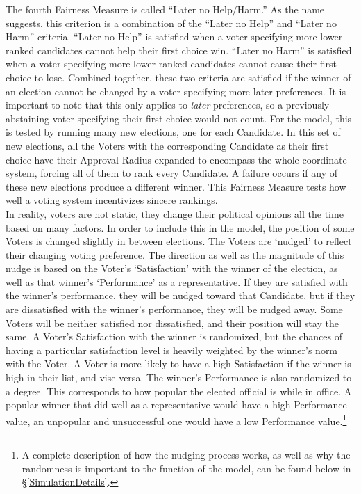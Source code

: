 \documentclass[12pt]{article}
\begin{document}
\qquad The fourth Fairness Measure is called ``Later no Help/Harm.'' As the name suggests, this criterion is a combination of the ``Later no Help'' and ``Later no Harm'' criteria. ``Later no Help'' is satisfied when a voter specifying more lower ranked candidates cannot help their first choice win. ``Later no Harm'' is satisfied when a voter specifying more lower ranked candidates cannot cause their first choice to lose. Combined together, these two criteria are satisfied if the winner of an election cannot be changed by a voter specifying more later preferences. It is important to note that this only applies to \textit{later} preferences, so a previously abstaining voter specifying their first choice would not count. For the model, this is tested by running many new elections, one for each Candidate. In this set of new elections, all the Voters with the corresponding Candidate as their first choice have their Approval Radius expanded to encompass the whole coordinate system, forcing all of them to rank every Candidate. A failure occurs if any of these new elections produce a different winner. This Fairness Measure tests how well a voting system incentivizes sincere rankings. \\ 

\qquad In reality, voters are not static, they change their political opinions all the time based on many factors. In order to include this in the model, the position of some Voters is changed slightly in between elections. The Voters are `nudged' to reflect their changing voting preference. The direction as well as the magnitude of this nudge is based on the Voter's `Satisfaction' with the winner of the election, as well as that winner's `Performance' as a representative. If they are satisfied with the winner's performance, they will be nudged toward that Candidate, but if they are dissatisfied with the winner's performance, they will be nudged away. Some Voters will be neither satisfied nor dissatisfied, and their position will stay the same. A Voter's Satisfaction with the winner is randomized, but the chances of having a particular satisfaction level is heavily weighted by the winner's norm with the Voter. A Voter is more likely to have a high Satisfaction if the winner is high in their list, and vise-versa. The winner's Performance is also randomized to a degree. This corresponds to how popular the elected official is while in office. A popular winner that did well as a representative would have a high Performance value, an unpopular and unsuccessful one would have a low Performance value.\footnote{A complete description of how the nudging process works, as well as why the randomness is important to the function of the model, can be found below in \S \ref{SimulationDetails}.} \\
\end{document}
